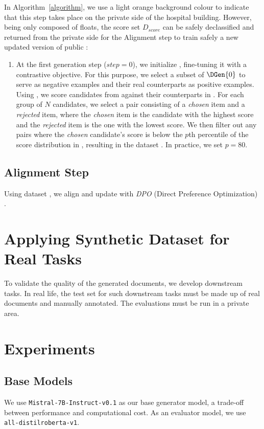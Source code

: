 In Algorithm~\ref{algorithm}, we use a light orange background colour to indicate that this step takes place on the private side of the hospital building. However, being only composed of floats, the score set $D_{score}$ can be safely declassified and returned from the private side for the Alignment step to train safely a new updated version of public \mg:
\begin{enumerate}
    \item At the first generation step ($step = 0$), we initialize \me, fine-tuning it with a contrastive objective. For this purpose, we select a subset of $\DGen{0}$ to serve as negative examples and their real counterparts as positive examples.
    Using \me, we score candidates from \dgstar against their counterparts in \dtr. For each group of $N$ candidates, we select a pair consisting of a \textit{chosen} item and a \textit{rejected} item, where the \textit{chosen} item is the candidate with the highest score and the \textit{rejected} item is the one with the lowest score. We then filter out any pairs where the \textit{chosen} candidate's score is below the $p$th percentile of the score distribution in \dtr, resulting in the dataset \ddpo. In practice, we set $p = 80$.
\end{enumerate}

\subsection{Alignment Step}
Using dataset \ddpo, we align and update \mg with \textit{DPO} (Direct Preference Optimization) \citep{rafailov_direct_2023}.

\section{Applying Synthetic Dataset for Real Tasks}
To validate the quality of the generated documents, we develop downstream tasks. In real life, the test set for such downstream tasks must be made up of real documents and manually annotated.  The evaluations must be run in a private area.

\section{Experiments}
\label{sec:experiment}

\subsection{Base Models} We use \space\verb|Mistral-7B-Instruct-v0.1|\space\citep{jiang_mistral_2023} as our base generator model, a trade-off between performance and computational cost. As an evaluator model, we use \space\verb|all-distilroberta-v1|.
